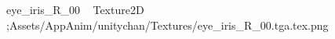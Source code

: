 
   eye_iris_R_00             	   Texture2D
   ;   Assets/AppAnim/unitychan/Textures/eye_iris_R_00.tga.tex.png
